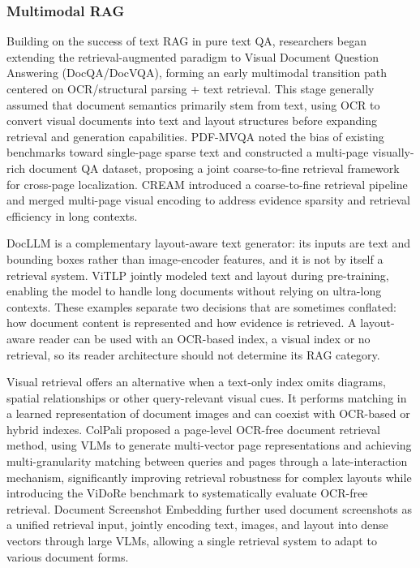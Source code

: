 \subsubsection{Multimodal RAG}
Building on the success of text RAG in pure text QA, researchers began extending the retrieval-augmented paradigm to Visual Document Question Answering (DocQA/DocVQA), forming an early multimodal transition path centered on OCR/structural parsing + text retrieval. This stage generally assumed that document semantics primarily stem from text, using OCR to convert visual documents into text and layout structures before expanding retrieval and generation capabilities. PDF-MVQA \cite{ding2024mvqa} noted the bias of existing benchmarks toward single-page sparse text and constructed a multi-page visually-rich document QA dataset, proposing a joint coarse-to-fine retrieval framework for cross-page localization. CREAM \cite{zhang2024cream} introduced a coarse-to-fine retrieval pipeline and merged multi-page visual encoding to address evidence sparsity and retrieval efficiency in long contexts.

DocLLM \cite{wang2024docllm} is a complementary layout-aware text generator: its inputs are text and bounding boxes rather than image-encoder features, and it is not by itself a retrieval system. ViTLP \cite{mao2024visually} jointly modeled text and layout during pre-training, enabling the model to handle long documents without relying on ultra-long contexts. These examples separate two decisions that are sometimes conflated: how document content is represented and how evidence is retrieved. A layout-aware reader can be used with an OCR-based index, a visual index or no retrieval, so its reader architecture should not determine its RAG category.

Visual retrieval offers an alternative when a text-only index omits diagrams, spatial relationships or other query-relevant visual cues. It performs matching in a learned representation of document images and can coexist with OCR-based or hybrid indexes. ColPali \cite{faysse2024colpali} proposed a page-level OCR-free document retrieval method, using VLMs to generate multi-vector page representations and achieving multi-granularity matching between queries and pages through a late-interaction mechanism, significantly improving retrieval robustness for complex layouts while introducing the ViDoRe benchmark to systematically evaluate OCR-free retrieval. Document Screenshot Embedding \cite{ma2024unifying} further used document screenshots as a unified retrieval input, jointly encoding text, images, and layout into dense vectors through large VLMs, allowing a single retrieval system to adapt to various document forms.

